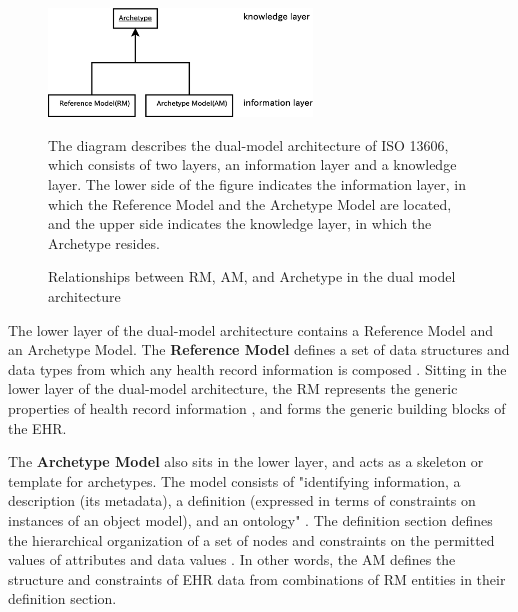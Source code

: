 \documentclass[preprint,3p,onecolumn,times,review]{article}
\begin{document}
\begin{figure}[!htbp]
  \begin{center}
    \includegraphics[width=7cm,clip]{dual_model_approach.eps}  
  \end{center}
  \caption{Relationships between RM, AM, and Archetype in the dual model architecture}\label{fig:dual_model_approach}
  {\footnotesize
    The diagram describes the dual-model architecture of ISO 13606, which consists of two layers, an information layer and a knowledge layer. The lower side of the figure indicates the information layer, in which the Reference Model and the Archetype Model are located, and the upper side indicates the knowledge layer, in which the Archetype resides.}
\end{figure}


The lower layer of the dual-model architecture contains a Reference Model and an Archetype Model.
The {\bf Reference Model} defines a set of data structures and data types from which any health record information is composed \cite[p.vi]{iso08:13606_healt_elect_part1}.
Sitting in the lower layer of the dual-model architecture, the RM represents the generic properties of health record information \cite[p.vi]{iso08:13606_healt_elect_part1} , and forms the generic building blocks of the EHR.

The {\bf Archetype Model} also sits in the lower layer, and acts as a skeleton or template for archetypes.
The model consists of "identifying information, a description (its metadata), a definition (expressed in terms of constraints on instances of an object model), and an ontology" \cite[p.vii]{iso08:13606_healt_elect_part2}.
The definition section defines the hierarchical organization of a set of nodes and constraints on the permitted values of attributes and data values \cite[p.6]{iso08:13606_healt_elect_part2}.
In other words, the AM defines the structure and constraints of EHR data from combinations of RM entities in their definition section. 
\end{document}

